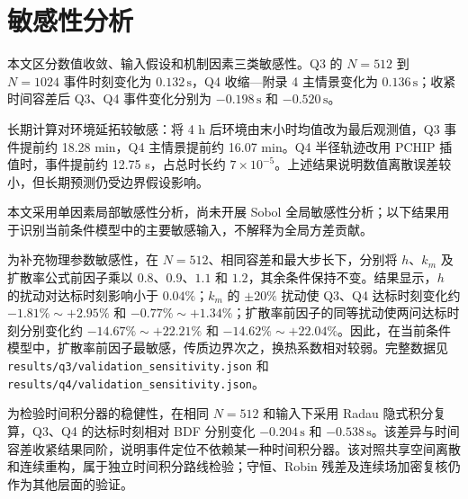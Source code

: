\section{敏感性分析}

本文区分数值收敛、输入假设和机制因素三类敏感性。Q3 的 $N=512$ 到 $N=1024$ 事件时刻变化为 $0.132\,\mathrm s$，Q4 收缩—附录 4 主情景变化为 $0.136\,\mathrm s$；收紧时间容差后 Q3、Q4 事件变化分别为 $-0.198\,\mathrm s$ 和 $-0.520\,\mathrm s$。

长期计算对环境延拓较敏感：将 4 h 后环境由末小时均值改为最后观测值，Q3 事件提前约 18.28 min，Q4 主情景提前约 16.07 min。Q4 半径轨迹改用 PCHIP 插值时，事件提前约 12.75 s，占总时长约 $7\times10^{-5}$。上述结果说明数值离散误差较小，但长期预测仍受边界假设影响。

本文采用单因素局部敏感性分析，尚未开展 Sobol 全局敏感性分析；以下结果用于识别当前条件模型中的主要敏感输入，不解释为全局方差贡献。

为补充物理参数敏感性，在 $N=512$、相同容差和最大步长下，分别将 $h$、$k_m$ 及扩散率公式前因子乘以 $0.8$、$0.9$、$1.1$ 和 $1.2$，其余条件保持不变。结果显示，$h$ 的扰动对达标时刻影响小于 $0.04\%$；$k_m$ 的 $\pm20\%$ 扰动使 Q3、Q4 达标时刻变化约 $-1.81\%\sim+2.95\%$ 和 $-0.77\%\sim+1.34\%$；扩散率前因子的同等扰动使两问达标时刻分别变化约 $-14.67\%\sim+22.21\%$ 和 $-14.62\%\sim+22.04\%$。因此，在当前条件模型中，扩散率前因子最敏感，传质边界次之，换热系数相对较弱。完整数据见 \texttt{results/q3/validation\_sensitivity.json} 和 \texttt{results/q4/validation\_sensitivity.json}。

为检验时间积分器的稳健性，在相同 $N=512$ 和输入下采用 Radau 隐式积分复算，Q3、Q4 的达标时刻相对 BDF 分别变化 $-0.204\,\mathrm s$ 和 $-0.538\,\mathrm s$。该差异与时间容差收紧结果同阶，说明事件定位不依赖某一种时间积分器。该对照共享空间离散和连续重构，属于独立时间积分路线检验；守恒、Robin 残差及连续场加密复核仍作为其他层面的验证。
